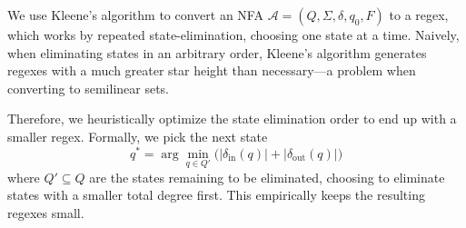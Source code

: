 We use Kleene's algorithm to convert an NFA $\mathcal A=(Q,\Sigma,\delta,q_0,F)$ to a regex, which works by repeated state-elimination, choosing one state at a time.
Naively, when eliminating states in an arbitrary order, Kleene's algorithm
generates regexes with a much greater star height than necessary---a problem
when converting to semilinear sets.

Therefore, we heuristically optimize the state elimination order to end up with a smaller regex. Formally, we pick the next state
\[
q^* = 
	\arg\min_{q\in Q'}\bigl(|\delta_{\mathrm{in}}(q)|+|\delta_{\mathrm{out}}(q)|\bigr)
\]
where \(Q'\subseteq Q\) are the states remaining to be eliminated, choosing to
eliminate states with a smaller total degree first.
%
This empirically keeps the resulting regexes small.


